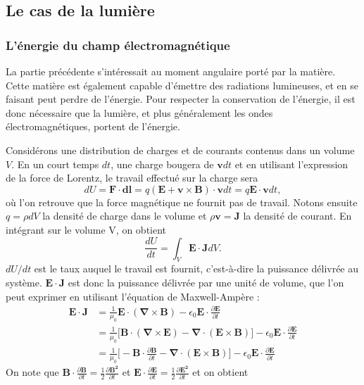 \subsection{Le cas de la lumière}
\subsubsection{L'énergie du champ électromagnétique}
La partie précédente s'intéressait au moment angulaire porté par la matière. Cette matière est également capable d'émettre des radiations lumineuses, et en se faisant peut perdre de l'énergie. Pour respecter la conservation de l'énergie, il est donc nécessaire que la lumière, et plus généralement les ondes électromagnétiques, portent de l'énergie.

Considérons une distribution de charges et de courants contenus dans un volume $V$. En un court temps $dt$, une charge bougera de $\bm{v}dt$ et en utilisant l'expression de la force de Lorentz, le travail effectué sur la charge sera
\begin{equation*}
dU = \bm{F}\cdot\bm{dl} = q(\bm{E}+\bm{v}\times\bm{B})\cdot\bm{v}dt = q\bm{E}\cdot \bm{v} dt,
\end{equation*}
où l'on retrouve que la force magnétique ne fournit pas de travail. Notons ensuite $q = \rho dV$ la densité de charge dans le volume et $\rho \bm{v} = \bm{J}$ la densité de courant. En intégrant sur le volume V, on obtient
\begin{equation*}
\frac{dU}{dt} = \int_V \bm{E} \cdot \bm{J} dV.
\end{equation*}
$dU/dt$ est le taux auquel le travail est fournit, c'est-à-dire la puissance délivrée au système. $\bm{E} \cdot \bm{J}$ est donc la puissance délivrée par une unité de volume, que l'on peut exprimer en utilisant l'équation de Maxwell-Ampère :
\begin{align*}
\bm{E} \cdot \bm{J} &= \frac{1}{\mu_0}\bm{E} \cdot (\bm{\nabla} \times \bm{B})-\epsilon_0\bm{E}\cdot\frac{\partial\bm{E}}{\partial t}\\
&= \frac{1}{\mu_0}\bigl[\bm{B} \cdot (\bm{\nabla} \times \bm{E})-\bm{\nabla} \cdot (\bm{E} \times \bm{B})\bigr]-\epsilon_0\bm{E}\cdot\frac{\partial\bm{E}}{\partial t}\\
&= \frac{1}{\mu_0}\bigl[-\bm{B} \cdot \frac{\partial\bm{B}}{\partial t}-\bm{\nabla} \cdot (\bm{E} \times \bm{B})\bigr]-\epsilon_0\bm{E}\cdot\frac{\partial\bm{E}}{\partial t}
\end{align*}
On note que $\bm{B} \cdot \frac{\partial\bm{B}}{\partial t} = \frac{1}{2}\frac{\partial\bm{B^2}}{\partial t}$ et $\bm{E} \cdot \frac{\partial\bm{E}}{\partial t} = \frac{1}{2}\frac{\partial\bm{E^2}}{\partial t}$ et on obtient
